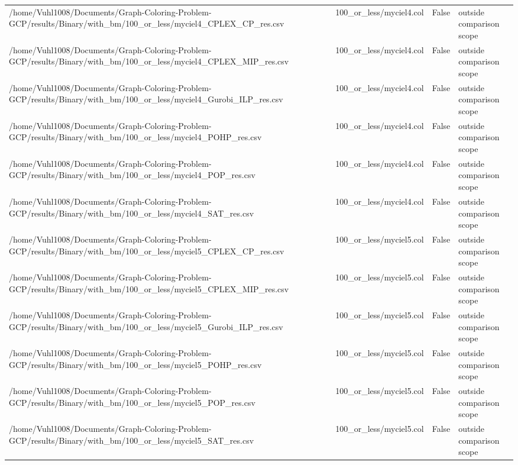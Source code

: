 \begin{table}[htbp]
\begin{tabular}{llll}
/home/Vuhl1008/Documents/Graph-Coloring-Problem-GCP/results/Binary/with\_bm/100\_or\_less/myciel4\_CPLEX\_CP\_res.csv & 100\_or\_less/myciel4.col & False & outside comparison scope \\
/home/Vuhl1008/Documents/Graph-Coloring-Problem-GCP/results/Binary/with\_bm/100\_or\_less/myciel4\_CPLEX\_MIP\_res.csv & 100\_or\_less/myciel4.col & False & outside comparison scope \\
/home/Vuhl1008/Documents/Graph-Coloring-Problem-GCP/results/Binary/with\_bm/100\_or\_less/myciel4\_Gurobi\_ILP\_res.csv & 100\_or\_less/myciel4.col & False & outside comparison scope \\
/home/Vuhl1008/Documents/Graph-Coloring-Problem-GCP/results/Binary/with\_bm/100\_or\_less/myciel4\_POHP\_res.csv & 100\_or\_less/myciel4.col & False & outside comparison scope \\
/home/Vuhl1008/Documents/Graph-Coloring-Problem-GCP/results/Binary/with\_bm/100\_or\_less/myciel4\_POP\_res.csv & 100\_or\_less/myciel4.col & False & outside comparison scope \\
/home/Vuhl1008/Documents/Graph-Coloring-Problem-GCP/results/Binary/with\_bm/100\_or\_less/myciel4\_SAT\_res.csv & 100\_or\_less/myciel4.col & False & outside comparison scope \\
/home/Vuhl1008/Documents/Graph-Coloring-Problem-GCP/results/Binary/with\_bm/100\_or\_less/myciel5\_CPLEX\_CP\_res.csv & 100\_or\_less/myciel5.col & False & outside comparison scope \\
/home/Vuhl1008/Documents/Graph-Coloring-Problem-GCP/results/Binary/with\_bm/100\_or\_less/myciel5\_CPLEX\_MIP\_res.csv & 100\_or\_less/myciel5.col & False & outside comparison scope \\
/home/Vuhl1008/Documents/Graph-Coloring-Problem-GCP/results/Binary/with\_bm/100\_or\_less/myciel5\_Gurobi\_ILP\_res.csv & 100\_or\_less/myciel5.col & False & outside comparison scope \\
/home/Vuhl1008/Documents/Graph-Coloring-Problem-GCP/results/Binary/with\_bm/100\_or\_less/myciel5\_POHP\_res.csv & 100\_or\_less/myciel5.col & False & outside comparison scope \\
/home/Vuhl1008/Documents/Graph-Coloring-Problem-GCP/results/Binary/with\_bm/100\_or\_less/myciel5\_POP\_res.csv & 100\_or\_less/myciel5.col & False & outside comparison scope \\
/home/Vuhl1008/Documents/Graph-Coloring-Problem-GCP/results/Binary/with\_bm/100\_or\_less/myciel5\_SAT\_res.csv & 100\_or\_less/myciel5.col & False & outside comparison scope \\

\end{tabular}
\end{table}
